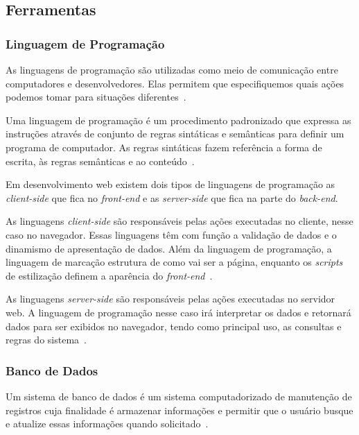 \subsection{Ferramentas}


\subsubsection{Linguagem de Programação}

As linguagens de programação são utilizadas como meio de comunicação entre computadores e desenvolvedores. 
Elas permitem que especifiquemos quais ações podemos tomar para situações diferentes~\cite{costa2017colossus}.

Uma linguagem de programação é um procedimento padronizado que expressa as instruções através de conjunto de regras sintáticas e semânticas para definir um programa de computador.
As regras sintáticas fazem referência a forma de escrita, às regras semânticas e ao conteúdo~\cite{gotardo2015linguagem}.

Em desenvolvimento web existem dois tipos de linguagens de programação as \textit{client-side} que fica no \textit{front-end} e as \textit{server-side} que fica na parte do \textit{back-end}.

As linguagens \textit{client-side} são responsáveis pelas ações executadas no cliente, nesse caso no navegador.
Essas linguagens têm com função a validação de dados e o dinamismo de apresentação de dados.
Além da linguagem de programação, a linguagem de marcação estrutura de como vai ser a página, enquanto os \textit{scripts} de estilização definem a aparência do \textit{front-end}~\cite{silveira2015desenvolvimento}.

As linguagens \textit{server-side} são responsáveis pelas ações executadas no servidor web.
A linguagem de programação nesse caso irá interpretar os dados e retornará dados para ser exibidos no navegador, tendo como principal uso, as consultas e regras do sistema~\cite{campos2007realidade}.

\subsubsection{Banco de Dados}

Um sistema de banco de dados é um sistema computadorizado de manutenção de registros cuja finalidade é armazenar informações e permitir que o usuário busque e atualize essas informações quando solicitado~\cite{date2004introduccao}.

